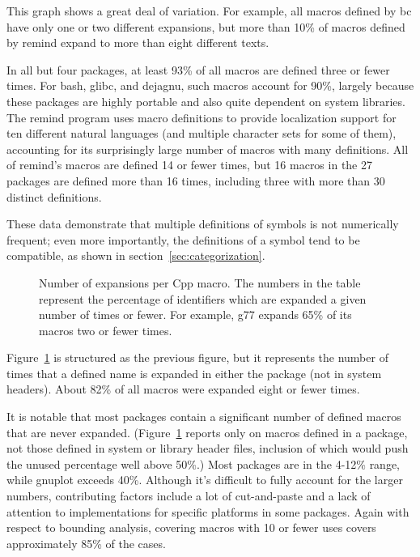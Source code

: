 \documentclass[11pt]{article}
\def\numpackages{27}
\begin{document}
This graph shows a great deal of variation.  For example, all macros
defined by bc have only one or two different expansions, but more than 10\%
of macros defined by remind expand to more than eight different texts.

In all but four packages, at least 93\% of all macros are defined three or
fewer times.  For bash, glibc, and dejagnu, such macros account for 90\%,
largely because these packages are highly portable and also quite dependent
on system libraries.  The remind program uses macro definitions to provide
localization support for ten different natural languages (and multiple
character sets for some of them), accounting for its surprisingly large
number of macros with many definitions.  All of remind's macros are defined
14 or fewer times, but 16 macros in the {\numpackages} packages are defined
more than 16 times, including three with more than 30 distinct definitions.

These data demonstrate that multiple definitions of symbols is not
numerically frequent; even more importantly, the definitions of a symbol
tend to be compatible, as shown in section~\ref{sec:categorization}.


\begin{figure}
\centerline{}
\caption{Number of expansions per Cpp macro.  The numbers in the
  table represent the percentage of identifiers which are expanded a given
  number of times or fewer.  For example, g77 expands 65\% of its
  macros two or fewer times.}
\label{fig:freq-use}
\end{figure}

Figure~\ref{fig:freq-use} is structured as the previous figure, but it
represents the number of times that a defined name is expanded in either
the package (not in system headers).  About 82\% of all macros were
expanded eight or fewer times.

It is notable that most packages contain a significant number of defined
macros that are never expanded.  (Figure~\ref{fig:freq-use} reports only on
macros defined in a package, not those defined in system or library header
files, inclusion of which would push the unused percentage well above
50\%.)  Most packages are in the 4-12\% range, while gnuplot exceeds 40\%.
Although it's difficult to fully account for the larger numbers,
contributing factors include a lot of cut-and-paste and a lack of attention
to implementations for specific platforms in some packages.  Again with
respect to bounding analysis, covering macros with 10 or fewer uses covers
approximately 85\% of the cases.
\end{document}
